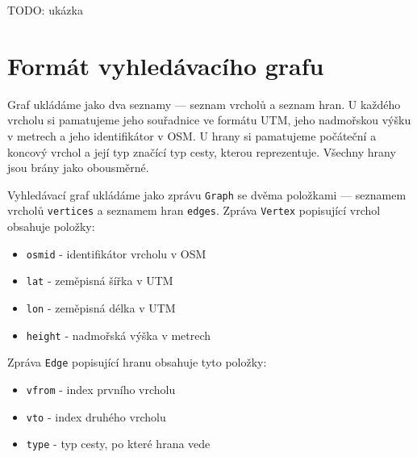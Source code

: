 TODO: ukázka

\section{Formát vyhledávacího grafu}
Graf ukládáme jako dva seznamy --- seznam vrcholů a seznam hran. U každého
vrcholu si pamatujeme jeho souřadnice ve formátu UTM, jeho nadmořskou výšku v
metrech a jeho identifikátor v OSM. U hrany si pamatujeme počáteční a koncový
vrchol a její typ značící typ cesty, kterou reprezentuje. Všechny hrany jsou
brány jako obousměrné.

Vyhledávací graf ukládáme jako zprávu \verb|Graph| se dvěma položkami ---
seznamem vrcholů \verb|vertices| a seznamem hran \verb|edges|. Zpráva
\verb|Vertex| popisující vrchol obsahuje položky:
\begin{itemize}
	\item \verb|osmid| - identifikátor vrcholu v OSM
	\item \verb|lat| - zeměpisná šířka v UTM
	\item \verb|lon| - zeměpisná délka v UTM
	\item \verb|height| - nadmořská výška v metrech
\end{itemize}
Zpráva \verb|Edge| popisující hranu obsahuje tyto položky:
\begin{itemize}
	\item \verb|vfrom| - index prvního vrcholu
	\item \verb|vto| - index druhého vrcholu
	\item \verb|type| - typ cesty, po které hrana vede
\end{itemize}

